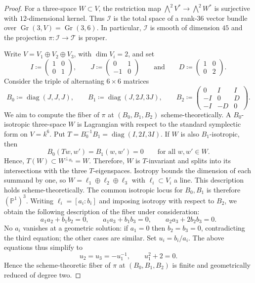 \documentclass[a4paper,11pt]{amsart}
\numberwithin{equation}{section}
\theoremstyle{definition}
\theoremstyle{remark}
\newcommand{\PP}{\mathbb P}
\newcommand{\Gr}{\operatorname{Gr}}
\DeclareMathOperator{\diag}{diag}
\newcommand{\cI}{\mathcal I}
\newcommand{\cT}{\mathcal T}
\begin{document}
\begin{proof}
For a three-space $W\subset V$, the restriction map $\bigwedge^2V^*\to\bigwedge^2W^*$ is surjective with $12$-dimensional kernel.
Thus $\cI$ is the total space of a rank-$36$ vector bundle over
$\Gr(3,V)=\Gr(3,6)$.
In particular, $\mathcal I$ is smooth of dimension $45$ and the projection
$\pi:\cI\to\cT$ is proper.

Write $V=V_1\oplus V_2\oplus V_3$, with $\dim V_i=2$, and set
\[
 I\coloneq \begin{pmatrix}1&0\\0&1\end{pmatrix}  ,\qquad J\coloneq \begin{pmatrix}0&1\\-1&0\end{pmatrix} \qquad \text{and}
 \qquad D\coloneq \begin{pmatrix}1&0\\0&2\end{pmatrix}.
\]
Consider the triple
of alternating $6\times 6$ matrices
\begin{equation}\label{eq:triple}
 B_0\coloneq \diag(J,J,J),\qquad B_1\coloneq \diag(J,2J,3J),\qquad
 B_2\coloneq \begin{pmatrix}0&I&I\\-I&0&D\\-I&-D&0\end{pmatrix}.
\end{equation}
We aim to compute the fiber of $\pi$ at $(B_0,B_1,B_2)$ scheme-theoretically.
A $B_0$-isotropic three-space $W$ is Lagrangian 
with respect to the standard symplectic form on $V=k^6$.
Put
$T=B_0^{-1}B_1=\diag(I,2I,3I)$. If $W$ is also
$B_1$-isotropic, then
\[
 B_0(Tw,w')=B_1(w,w')=0\qquad \text{for all }w,w'\in W . 
\]
Hence, $T(W)\subset W^{\perp_{B_0}}=W$.
Therefore, $W$ is $T$-invariant and splits into its intersections with the
three $T$-eigenspaces. Isotropy bounds the dimension of each summand by one,
so $W=\ell_1\oplus\ell_2\oplus\ell_3$ with $\ell_i\subset V_i$
a line. 
This description holds scheme-theoretically.
The common isotropic locus for $B_0,B_1$ is therefore $(\PP^1)^3$.
Writing $\ell_i=[a_i:b_i]$ and imposing isotropy with respect to $B_2$,
we obtain the following description of the fiber under consideration: 
\[
 a_1a_2+b_1b_2=0,\qquad
 a_1a_3+b_1b_3=0,\qquad
 a_2a_3+2b_2b_3=0.
\]
No $a_i$ vanishes at a geometric solution: if $a_1=0$ then
$b_2=b_3=0$, contradicting the third equation; the other cases are
similar. Set $u_i=b_i/a_i$. The %
above equations thus simplify to
\begin{equation}\label{eq:fiber}
 u_2=u_3=-u_1^{-1},\qquad u_1^2+2=0.
\end{equation}
Hence the scheme-theoretic fiber of $\pi$ at $(B_0,B_1,B_2)$ is finite and geometrically reduced of degree two.


\end{proof}
\end{document}
